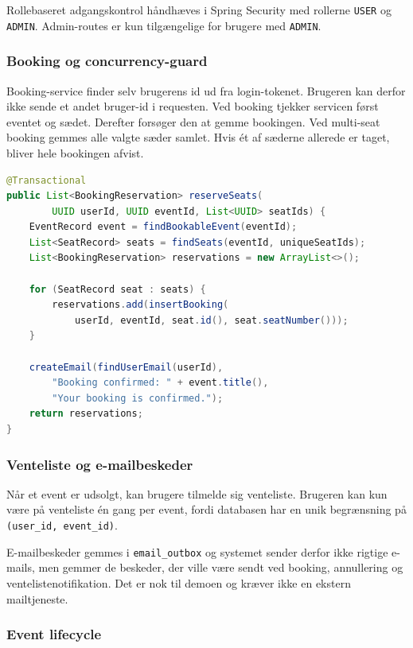 \documentclass[11pt,a4paper]{article}
\newcommand{\code}[1]{\texttt{#1}}
\begin{document}
Rollebaseret adgangskontrol håndhæves i Spring Security med rollerne \code{USER} og \code{ADMIN}. Admin-routes er kun tilgængelige for brugere med \code{ADMIN}.

\subsubsection{Booking og concurrency-guard}

Booking-service finder selv brugerens id ud fra login-tokenet. Brugeren kan derfor ikke sende et andet bruger-id i requesten. Ved booking tjekker servicen først eventet og sædet. Derefter forsøger den at gemme bookingen. Ved multi-seat booking gemmes alle valgte sæder samlet. Hvis ét af sæderne allerede er taget, bliver hele bookingen afvist.

\begin{lstlisting}[language=Java,caption={Forenklet transaktionel multi-seat booking}]
@Transactional
public List<BookingReservation> reserveSeats(
        UUID userId, UUID eventId, List<UUID> seatIds) {
    EventRecord event = findBookableEvent(eventId);
    List<SeatRecord> seats = findSeats(eventId, uniqueSeatIds);
    List<BookingReservation> reservations = new ArrayList<>();

    for (SeatRecord seat : seats) {
        reservations.add(insertBooking(
            userId, eventId, seat.id(), seat.seatNumber()));
    }

    createEmail(findUserEmail(userId),
        "Booking confirmed: " + event.title(),
        "Your booking is confirmed.");
    return reservations;
}
\end{lstlisting}

\subsubsection{Venteliste og e-mailbeskeder}

Når et event er udsolgt, kan brugere tilmelde sig venteliste. Brugeren kan kun være på venteliste én gang per event, fordi databasen har en unik begrænsning på \code{(user\_id, event\_id)}.

E-mailbeskeder gemmes i \code{email\_outbox} og systemet sender derfor ikke rigtige e-mails, men gemmer de beskeder, der ville være sendt ved booking, annullering og ventelistenotifikation. Det er nok til demoen og kræver ikke en ekstern mailtjeneste.

\subsubsection{Event lifecycle}
\end{document}
